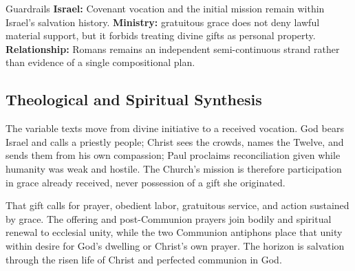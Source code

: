 \begin{deepstudy}
\begin{studybox}{Guardrails}
\textbf{Israel:} Covenant vocation and the initial mission remain within Israel's salvation history. \textbf{Ministry:} gratuitous grace does not deny lawful material support, but it forbids treating divine gifts as personal property. \textbf{Relationship:} Romans remains an independent semi-continuous strand rather than evidence of a single compositional plan.
\end{studybox}

\clearpage
\subsection*{Theological and Spiritual Synthesis}

The variable texts move from divine initiative to a received vocation. God bears Israel and calls a priestly people; Christ sees the crowds, names the Twelve, and sends them from his own compassion; Paul proclaims reconciliation given while humanity was weak and hostile. The Church's mission is therefore participation in grace already received, never possession of a gift she originated.

That gift calls for prayer, obedient labor, gratuitous service, and action sustained by grace. The offering and post-Communion prayers join bodily and spiritual renewal to ecclesial unity, while the two Communion antiphons place that unity within desire for God's dwelling or Christ's own prayer. The horizon is salvation through the risen life of Christ and perfected communion in God.


\end{deepstudy}
